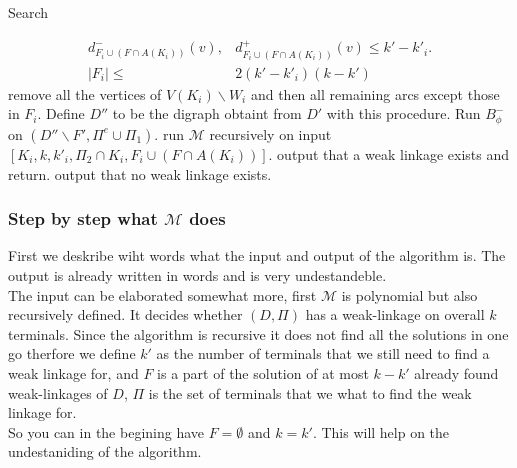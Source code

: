 \documentclass{beamer}
\begin{document}
\begin{frame}[allowframebreaks]{Search}
\begin{algorithmic}[1]
{\begin{align}
                    d^-_{F_i\cup(F\cap A(K_i))}(v),&d^+_{F_i\cup(F\cap A(K_i))}(v)\leq k'-k'_i.\\
                    |F_i|\leq &2(k'-k'_i)(k-k')
                \end{align}
                }
                        \STATE remove all the vertices of $V(K_i)\backslash W_i$ and then all remaining arcs except those in $F_i$.
                    \ENDFOR
                    \STATE Define $D''$ to be the digraph obtaint from $D'$ with this procedure.
                    \STATE Run $B_{\phi}^-$ on $(D''\backslash F',\Pi^e\cup\Pi_1)$.
                        \STATE run $\mathcal{M}$ recursively on input $[K_i,k,k'_i,\Pi_2\cap K_i,F_i\cup(F\cap A(K_i))]$.
                    \ENDFOR 
                \ENDFOR
            \ENDIF
                \STATE output that a weak linkage exists and return.
            \ENDIF
        \ENDFOR 
            \STATE output that no weak linkage exists.
        \ENDIF
    \end{algorithmic}
 \end{frame}


\begin{frame}
    \frametitle{Step by step what $\mathcal{M}$ does}
    First we deskribe wiht words what the input and output of the algorithm is. 
    The output is already written in words and is very undestandeble. \\
    The input can be elaborated somewhat more, first $\mathcal{M}$ is polynomial but also recursively defined. 
    It decides whether $(D,\Pi)$  has a weak-linkage on overall $k$ terminals. 
    Since the algorithm is recursive it does not find all the solutions in one go therfore we define $k'$ as the number of terminals that we still need to find a weak linkage for, and $F$ is a part of the solution of at most $k-k'$ already found weak-linkages of $D$, $\Pi$ is the set of terminals that we what to find the weak linkage for. \\
    So you can in the begining have $F=\emptyset$ and $k=k'$. This will help on the undestaniding of the algorithm.    
\end{frame}
\end{document}
